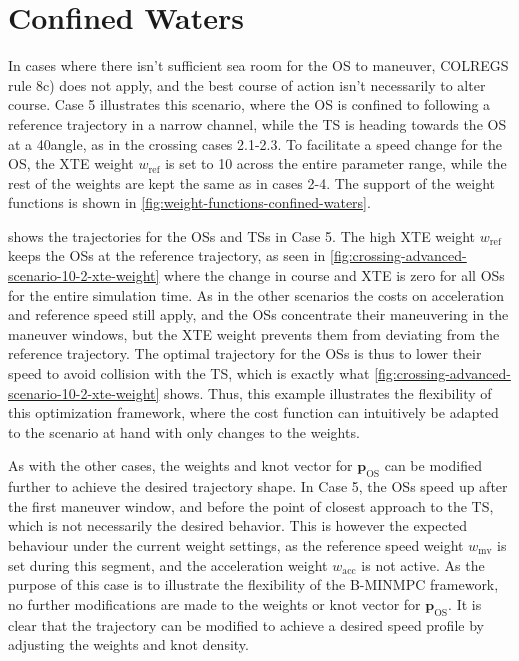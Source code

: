 \section{Confined Waters}\label{sec:confined-waters}
In cases where there isn't sufficient sea room for the OS to maneuver, COLREGS rule 8c) does not apply, and the best course of action isn't necessarily to alter course. Case 5 illustrates this scenario, where the OS is confined to following a reference trajectory in a narrow channel, while the TS is heading towards the OS at a 40\degree angle, as in the crossing cases 2.1-2.3. To facilitate a speed change for the OS, the XTE weight $w_\text{ref}$ is set to 10 across the entire parameter range, while the rest of the weights are kept the same as in cases 2-4. The support of the weight functions is shown in \cref{fig:weight-functions-confined-waters}. 

 shows the trajectories for the OSs and TSs in Case 5. The high XTE weight $w_\text{ref}$ keeps the OSs at the reference trajectory, as seen in \cref{fig:crossing-advanced-scenario-10-2-xte-weight} where the change in course and XTE is zero for all OSs for the entire simulation time. As in the other scenarios the costs on acceleration and reference speed still apply, and the OSs concentrate their maneuvering in the maneuver windows, but the XTE weight prevents them from deviating from the reference trajectory. The optimal trajectory for the OSs is thus to lower their speed to avoid collision with the TS, which is exactly what \cref{fig:crossing-advanced-scenario-10-2-xte-weight} shows. 
Thus, this example illustrates the flexibility of this optimization framework, where the cost function can intuitively be adapted to the scenario at hand with only changes to the weights. 

As with the other cases, the weights and knot vector for $\mathbf p_\text{OS}$ can be modified further to achieve the desired trajectory shape. In Case 5, the OSs speed up after the first maneuver window, and before the point of closest approach to the TS, which is not necessarily the desired behavior. This is however the expected behaviour under the current weight settings, as the reference speed weight $w_\text{mv}$ is set during this segment, and the acceleration weight $w_\text{acc}$ is not active. As the purpose of this case is to illustrate the flexibility of the B-MINMPC framework, no further modifications are made to the weights or knot vector for $\mathbf p_\text{OS}$. It is clear that the trajectory can be modified to achieve a desired speed profile by adjusting the weights and knot density.

